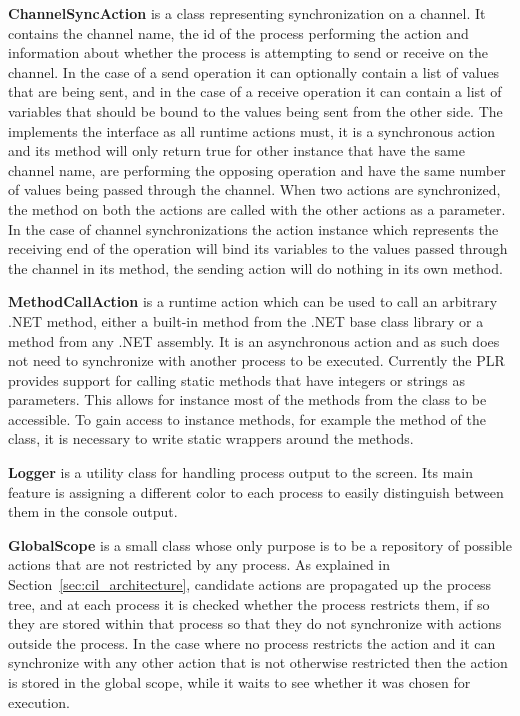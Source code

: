 	\textbf{ChannelSyncAction} is a class representing synchronization on a
	channel. It contains the channel name, the id of the process performing
	the action and information about whether the process is attempting to send
	or receive on the channel. In the case of a send operation it can optionally
	contain a list of values that are being sent, and in the case of a receive
	operation it can contain a list of variables that should be bound to the 
	values being sent from the other side. The 
	implements the  interface as all runtime actions must, it is
	a synchronous action and its  method will only return 
	true for other  instance that have the same
	channel name, are performing the opposing operation and have the same
	number of values being passed through the channel. When two actions are
	synchronized, the  method on both the actions
	are called with the other actions as a parameter. In the case of channel 
	synchronizations the action instance which represents the receiving end
	of the operation will bind its variables to the values passed through
	the channel in its  method, the sending action will do nothing
	in its own  method.
	
	\textbf{MethodCallAction} is a runtime action which can be used to call
	an arbitrary .NET method, either a built-in method from the .NET base
	class library or a method from any .NET assembly. It is an asynchronous 
	action and as such does not need to synchronize with another process to be 
	executed. Currently	the PLR provides support for calling static methods 
	that have integers or	strings as parameters. This allows for instance most
	of the methods from the  class to be accessible. To
	gain access to instance methods, for example the  method
	of the  class, it is necessary to write static wrappers
	around the methods.

	\textbf{Logger} is a utility class for handling process output to the screen.
	Its main feature is assigning a different color to each process to 
	easily distinguish between them in the console output.

	\textbf{GlobalScope} is a small class whose only purpose is to be a 
	repository of possible actions that are not restricted by any process. As
	explained in Section~\ref{sec:cil_architecture}, candidate actions are 
	propagated up the process tree, and at each process it is checked whether 
	the process restricts them, if so they are stored within that process so 
	that they do not synchronize with actions outside the process. In the case 
	where no process restricts the action and it can synchronize with any other 
	action that is not otherwise restricted then the action is stored in the 
	global scope, while it waits to see whether it was chosen for execution.
	
